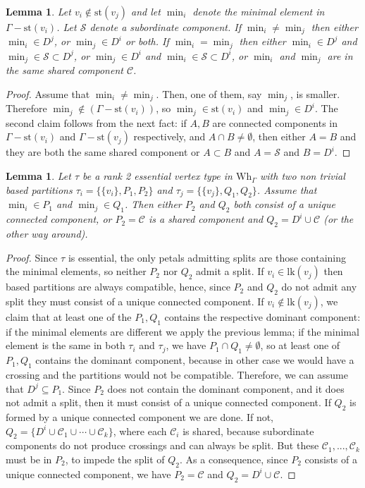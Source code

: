 \documentclass[a4paper]{amsart}
\newcommand{\G}{\Gamma}
\newcommand{\C}{\mathcal{C}}
\newcommand{\Wh}{\mathrm{Wh}}
\newcommand{\lk}{\mathrm{lk}}
\newcommand{\st}{\mathrm{st}}
\newtheorem{lem}[teo]{Lemma}
\theoremstyle{definition}
\theoremstyle{remark}
\begin{document}
\begin{lem}\label{lem:minimal-component}
    Let $v_i\notin\st(v_j)$ and let $\min_i$ denote the minimal element in $\G-\st(v_i)$. Let $\mathcal{S}$ denote a subordinate component.  If $\min_i\neq\min_j$ then either $\min_i\in D^j$, or $\min_j\in D^i$ or both. If  $\min_i=\min_j$ then either $\min_i\in D^j$ and $\min_j\in \mathcal{S}\subset D^j$,  or $\min_j\in D^i$ and $\min_i\in \mathcal{S}\subset D^i$,  or $\min_i$ and $\min_j$ are in the same shared component $\C$.
\end{lem}
\begin{proof}
    Assume that $\min_i\neq\min_j$. Then, one of them, say $\min_j$, is smaller. Therefore $\min_j\notin(\G-\st(v_i))$, so $\min_j\in\st(v_i)$ and $\min_j\in D^i$. The second claim follows  from the next fact: if $A,B$ are connected components in $\G-\st(v_i)$ and    $\G-\st(v_j)$ respectively, and $A\cap B\neq\emptyset$, then either $A=B$ and they are both the same shared component or $A\subset B$ and $A=\mathcal{S}$ and $B=D^i$.
    
\end{proof}


\begin{lem}\label{lem:rank2Partitions}
    Let $\tau$ be a rank 2 essential vertex type in $\Wh_\G$ with two non trivial based partitions $\tau_i=\{\{v_i\}, P_1, P_2\}$ and $\tau_j=\{\{v_j\}, Q_1, Q_2\}$. Assume that $\min_i\in P_1$ and $\min_j\in Q_1$. Then either $P_2$ and $Q_2$ both consist of a unique connected component, or $P_2=\C$ is a shared component and $Q_2=D^i\cup\C$ (or the other way around).
\end{lem}
\begin{proof}
    Since $\tau$ is essential, the only petals admitting splits are those containing the minimal elements, so neither $P_2$ nor $Q_2$ admit a split. If $v_i\in\lk(v_j)$ then based partitions are always compatible, hence, since $P_2$ and $Q_2$ do not admit any split they must consist of a unique connected component. If $v_i\notin\lk(v_j)$, we claim that at least one of the $P_1,Q_1$ contains the respective dominant component: if the minimal elements are different we apply the previous lemma; if the minimal element is the same in both $\tau_i$ and $\tau_j$, we  have  $P_1\cap Q_1\neq\emptyset$, so at least one of $P_1, Q_1$ contains the dominant component, because in other case we would have a crossing and the partitions would not be compatible. Therefore, we can assume that $D^j\subseteq P_1$. Since $P_2$ does not contain the dominant component, and it does not admit a split, then it must consist of a unique connected component. If $Q_2$ is formed by a unique connected component we are done. If not, $Q_2=\{D^i\cup \mathcal{C}_1\cup\cdots \cup \mathcal{C}_k\}$, where each $\mathcal{C}_i$ is shared, because subordinate components do not produce crossings and can always be split. But these $\mathcal{C}_1,...,\mathcal{C}_k$ must be in $P_2$, to impede the split of $Q_2$. As a consequence,  since $P_2$ consists of a unique connected component, we have $P_2=\C$ and $Q_2=D^i\cup \C$.
\end{proof}
\end{document}
